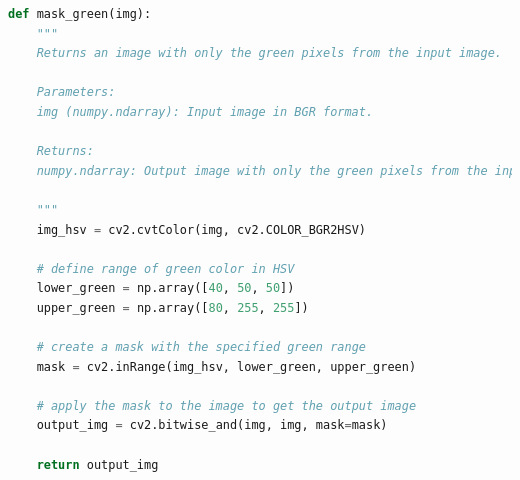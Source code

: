\begin{lstlisting}[language=Python, caption=Mask Green Function]
    def mask_green(img):
    """
    Returns an image with only the green pixels from the input image.
    
    Parameters:
    img (numpy.ndarray): Input image in BGR format.
    
    Returns:
    numpy.ndarray: Output image with only the green pixels from the input image.
    
    """
    img_hsv = cv2.cvtColor(img, cv2.COLOR_BGR2HSV)
    
    # define range of green color in HSV
    lower_green = np.array([40, 50, 50])
    upper_green = np.array([80, 255, 255])
    
    # create a mask with the specified green range
    mask = cv2.inRange(img_hsv, lower_green, upper_green)
    
    # apply the mask to the image to get the output image
    output_img = cv2.bitwise_and(img, img, mask=mask)
    
    return output_img
    
    
\end{lstlisting}




